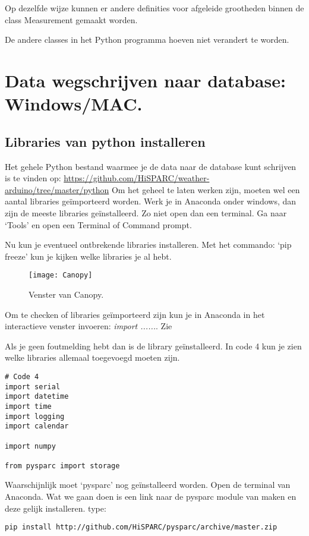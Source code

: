 Op dezelfde wijze kunnen er andere definities voor afgeleide grootheden
binnen de class Measurement gemaakt worden. 

De andere classes in het Python programma hoeven niet verandert te worden.


\section{Data wegschrijven naar \hisparc database: Windows/MAC.}

\subsection{Libraries van python installeren}

Het gehele Python bestand waarmee je de data naar de \hisparc database kunt schrijven 
is te vinden op:
\url{https://github.com/HiSPARC/weather-arduino/tree/master/python}
Om het geheel te laten werken zijn, moeten wel een aantal libraries geïmporteerd worden.
Werk je in Anaconda onder windows, dan zijn de meeste libraries geïnstalleerd.
Zo niet open dan een terminal. Ga naar `Tools' en open een Terminal of Command prompt.

Nu kun je eventueel ontbrekende libraries installeren. Met het commando: 
`pip freeze' kun je kijken welke libraries je al hebt. 

\begin{figure}
    \centering
    \texttt{[image: Canopy]}
    \caption{Venster van Canopy.}
   \label{fig:canopy1}
\end{figure}

Om te checken of libraries geïmporteerd zijn kun je in Anaconda in het
interactieve venster invoeren: \emph{import ......}. Zie

Als je geen foutmelding hebt dan is de library geïnstalleerd. 
In code 4 kun je zien welke libraries allemaal toegevoegd moeten zijn.
 
\begin{verbatim}
# Code 4
import serial
import datetime
import time
import logging
import calendar

import numpy

from pysparc import storage

\end{verbatim}

Waarschijnlijk moet `pysparc' nog geïnstalleerd worden. Open de terminal van
Anaconda. Wat we gaan doen is een link naar de pysparc module van \hisparc
maken en deze gelijk installeren. type: 
\begin{verbatim} 
pip install http://github.com/HiSPARC/pysparc/archive/master.zip 
\end{verbatim}

